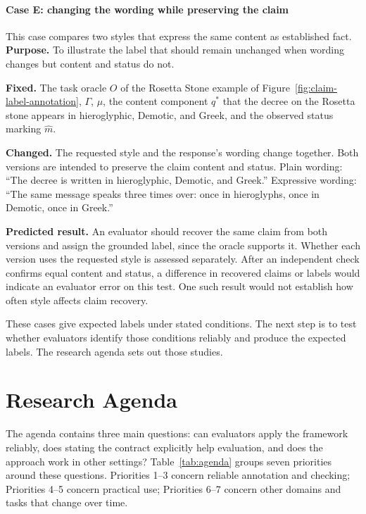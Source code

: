 \documentclass{clv2025}
\begin{document}
\paragraph{Case E: changing the wording while preserving the claim}
This case compares two styles that express the same content as established
fact.
\textbf{Purpose.} To illustrate the label that should remain unchanged when
wording changes but content and status do not.
\par\textbf{Fixed.} The task oracle $O$ of the Rosetta Stone example of
Figure~\ref{fig:claim-label-annotation}, $\Gamma$, $\mu$, the content component
$q^*$ that the decree on the Rosetta stone appears in hieroglyphic, Demotic, and Greek, and the
observed status marking $\widehat{m}$.
\par\textbf{Changed.} The requested style and the response's wording change
together. Both versions are intended to preserve the claim content and status.
Plain wording: ``The decree is written in hieroglyphic, Demotic, and
Greek.''
Expressive wording: ``The same message speaks three times over: once in
hieroglyphs, once in Demotic, once in Greek.''
\par\textbf{Predicted result.} An evaluator should recover the same claim
from both versions and assign the grounded label, since the oracle supports
it. Whether each version uses the requested style is assessed separately.
After an independent check confirms equal content and status, a difference
in recovered claims or labels would indicate an evaluator error on this test.
One such result would not establish how often style affects claim recovery.

These cases give expected labels under stated conditions. The next step is
to test whether evaluators identify those conditions reliably and produce
the expected labels. The research agenda sets out those studies.


\section{Research Agenda}\label{sec:agenda}

The agenda contains three main questions: can evaluators apply the framework reliably,
does stating the contract explicitly help evaluation, and does the approach
work in other settings? Table~\ref{tab:agenda} groups seven priorities around
these questions. Priorities 1--3 concern reliable annotation and checking;
Priorities 4--5 concern practical use; Priorities 6--7 concern other domains
and tasks that change over time.
\end{document}

